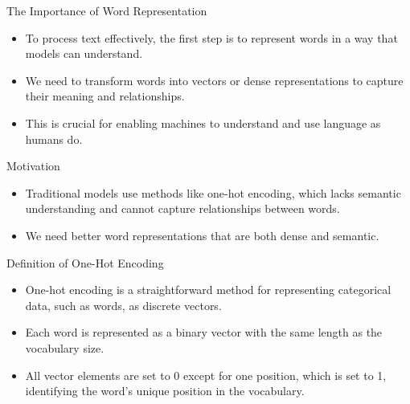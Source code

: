 \documentclass[serif, aspectratio=169]{beamer}
\begin{document}

\begin{frame}{The Importance of Word Representation}
	\begin{itemize}
		\item To process text effectively, the first step is to represent words in a way that models can understand.
		\item We need to transform words into vectors or dense representations to capture their meaning and relationships.
		\item This is crucial for enabling machines to understand and use language as humans do.
	\end{itemize}
\end{frame}



\begin{frame}{Motivation}
    \begin{itemize}
        \item Traditional models use methods like one-hot encoding, which lacks semantic understanding and cannot capture relationships between words.
        \item We need better word representations that are both dense and semantic.
    \end{itemize}
\end{frame}



\begin{frame}{Definition of One-Hot Encoding}
	\begin{itemize}
		\item One-hot encoding is a straightforward method for representing categorical data, such as words, as discrete vectors.
		\item Each word is represented as a binary vector with the same length as the vocabulary size.
		\item All vector elements are set to 0 except for one position, which is set to 1, identifying the word's unique position in the vocabulary.
	\end{itemize}
\end{frame}
\end{document}
